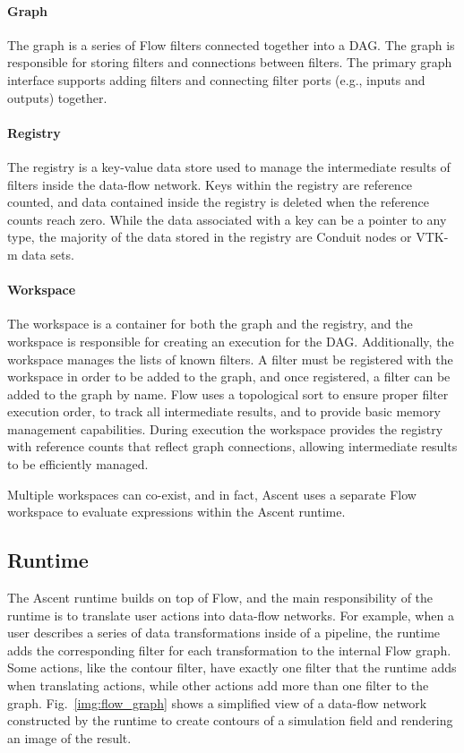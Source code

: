 \paragraph{Graph}
The graph is a series of Flow filters connected together into
a DAG.
%
The graph is responsible for storing filters and connections
between filters.
%
The primary graph interface supports adding filters and connecting
filter ports (e.g., inputs and outputs) together.

\paragraph{Registry}
The registry is a key-value data store used to manage the intermediate
results of filters inside the data-flow network.
%
Keys within the registry are reference counted, and data contained
inside the registry is deleted when the reference counts reach zero.
%
While the data associated with a key can be a pointer to any type,
the majority of the data stored in the registry are Conduit nodes
or VTK-m data sets.


\paragraph{Workspace}
The workspace is a container for both the graph and the registry,
and the workspace is responsible for creating an execution for the DAG.
%
Additionally, the workspace manages the lists of known filters.
%
A filter must be registered with the workspace in order to be added to the
graph, and once registered, a filter can be added to the graph by name.
%
Flow uses a topological sort to ensure proper filter execution order,
to track all intermediate results, and to provide basic memory management capabilities.
During execution the workspace provides the registry with reference counts that reflect graph connections, allowing intermediate results to be efficiently managed.

%
Multiple workspaces can co-exist, and in fact, Ascent uses a separate Flow workspace
to evaluate expressions within the Ascent runtime.
%

\subsection{Runtime}
The Ascent runtime builds on top of Flow, and the main responsibility of the
runtime is to translate user actions into data-flow networks.
%
For example, when a user describes a series of data transformations inside of a pipeline,
the runtime adds the corresponding filter for each transformation to
the internal Flow graph.
%
Some actions, like the contour filter, have exactly one filter that the runtime
adds when translating actions, while other actions add more than one filter to the graph.
%
Fig.~\ref{img:flow_graph} shows a simplified view of a data-flow network constructed by the
runtime to create contours of a simulation field and rendering an image of the result.
%

